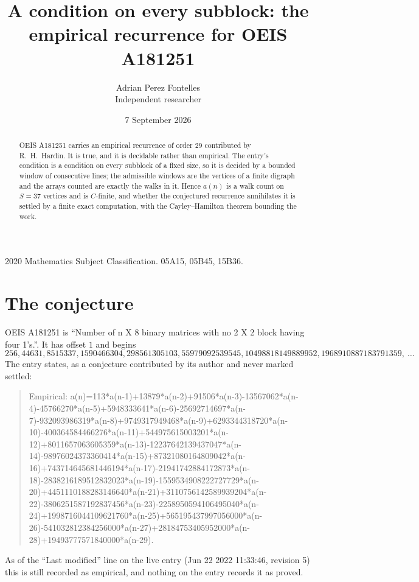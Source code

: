 \documentclass[11pt,a4paper]{article}
\title{A condition on every subblock: the empirical recurrence for OEIS A181251}
\author{Adrian Perez Fontelles\\ \small Independent researcher}
\date{7 September 2026}
\theoremstyle{plain}
\theoremstyle{definition}
\begin{document}
\maketitle

\begin{abstract}
OEIS A181251 carries an empirical recurrence of order $29$ contributed by R.~H.~Hardin. It is
true, and it is decidable rather than empirical. The entry's condition is a condition on every
subblock of a fixed size, so it is decided by a bounded window of consecutive lines; the
admissible windows are the vertices of a finite digraph and the arrays counted are exactly the
walks in it. Hence $a(n)$ is a walk count on $S=37$ vertices and is $C$-finite, and whether the
conjectured recurrence annihilates it is settled by a finite exact computation, with the
Cayley--Hamilton theorem bounding the work.
\end{abstract}

\noindent\small 2020 Mathematics Subject Classification. 05A15, 05B45, 15B36.\normalsize

\section{The conjecture}

OEIS A181251 is ``Number of n X 8 binary matrices with no 2 X 2 block having four 1's.''. It has offset $1$ and begins
\[
256, 44631, 8515337, 1590466304, 298561305103, 55979092539545, 10498818149889952, 1968910887183791359,\ \dots
\]
The entry states, as a conjecture contributed by its author and never marked settled:
\begin{quote}
Empirical: a(n)=113*a(n-1)+13879*a(n-2)+91506*a(n-3)-13567062*a(n-4)-45766270*a(n-5)+5948333641*a(n-6)-25692714697*a(n-7)-932093986319*a(n-8)+9749317949468*a(n-9)+6293344318720*a(n-10)-400364584466276*a(n-11)+544975615003201*a(n-12)+8011657063605359*a(n-13)-12237642139437047*a(n-14)-98976024373360414*a(n-15)+87321080164809042*a(n-16)+743714645681446194*a(n-17)-21941742884172873*a(n-18)-2838216189512832023*a(n-19)-1559534908222727729*a(n-20)+4451110188283146640*a(n-21)+3110756142589939204*a(n-22)-3806251587192837456*a(n-23)-2258950594106495040*a(n-24)+1998716044109621760*a(n-25)+565195437997056000*a(n-26)-541032812384256000*a(n-27)+28184753405952000*a(n-28)+19493777571840000*a(n-29).
\end{quote}
As of the ``Last modified'' line on the live entry (Jun 22 2022 11:33:46, revision 5) this is still
recorded as empirical, and nothing on the entry records it as proved.
\end{document}
